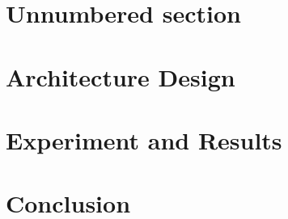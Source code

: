 \documentclass[12pt]{article}
\begin{document}
\lipsum[1]

\section*{Unnumbered section}
\lipsum[1]



\lipsum[1]
\frameboxend

\newpage

\section{Architecture Design}
\lipsum[1]

\section{Experiment and Results}
\lipsum[1]

\section{Conclusion}
\lipsum[1]
\end{document}
